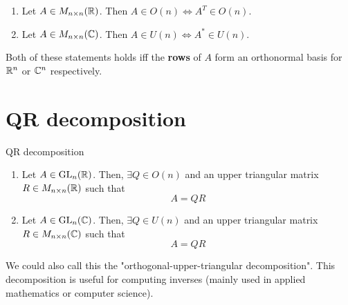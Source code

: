 \documentclass[12pt]{article}
\begin{document}
\begin{corollary}{}{}
    \begin{enumerate}
        \item Let $A \in M_{n \times n}(\mathbb{R})$. Then $A \in O(n) \iff A^T \in O(n)$.
        \item Let $A \in M_{n \times n}(\mathbb{C})$. Then $A \in U(n) \iff A^* \in U(n)$.
    \end{enumerate}
    
    Both of these statements holds iff the \textbf{rows} of $A$ form an orthonormal basis for $\mathbb{R}^n$ or $\mathbb{C}^n$ respectively.
\end{corollary}

\section{QR decomposition}

\begin{theorem}{QR decomposition}{}
    \begin{enumerate}
        \item Let $A \in \mathrm{GL}_n(\mathbb{R})$. Then, $\exists Q \in O(n)$ and an upper triangular matrix $R \in M_{n \times n}(\mathbb{R})$ such that
        $$
            A = QR
        $$
        \item Let $A \in \mathrm{GL}_n(\mathbb{C})$. Then, $\exists Q \in U(n)$ and an upper triangular matrix $R \in M_{n \times n}(\mathbb{C})$ such that
        $$
            A = QR
        $$
    \end{enumerate}
\end{theorem}

We could also call this the "orthogonal-upper-triangular decomposition". This decomposition is useful for computing inverses (mainly used in applied mathematics or computer science).
\end{document}
